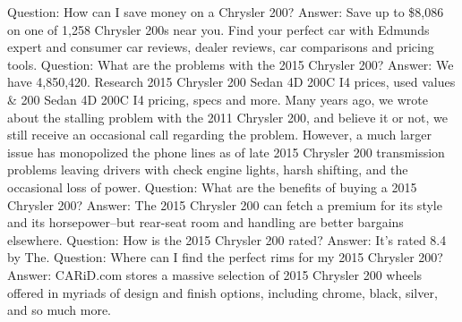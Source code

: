 \begin{tcolorbox}[colback=gray!20, colframe=gray!75, rounded corners, sharp corners=northeast, sharp corners=southwest]
{Question: How can I save money on a Chrysler 200? Answer: Save up to \$8,086 on one of 1,258 Chrysler 200s near you. Find your perfect car with Edmunds expert and consumer car reviews, dealer reviews, car comparisons and pricing tools. Question: What are the problems with the 2015 Chrysler 200? Answer: We have 4,850,420. Research 2015 Chrysler 200 Sedan 4D 200C I4 prices, used values \& 200 Sedan 4D 200C I4 pricing, specs and more. Many years ago, we wrote about the stalling problem with the 2011 Chrysler 200, and believe it or not, we still receive an occasional call regarding the problem. However, a much larger issue has monopolized the phone lines as of late 2015 Chrysler 200 transmission problems leaving drivers with check engine lights, harsh shifting, and the occasional loss of power. Question: What are the benefits of buying a 2015 Chrysler 200? Answer: The 2015 Chrysler 200 can fetch a premium for its style and its horsepower--but rear-seat room and handling are better bargains elsewhere. Question: How is the 2015 Chrysler 200 rated? Answer: It's rated 8.4 by The. Question: Where can I find the perfect rims for my 2015 Chrysler 200? Answer: CARiD.com stores a massive selection of 2015 Chrysler 200 wheels offered in myriads of design and finish options, including chrome, black, silver, and so much more.}
\end{tcolorbox}


